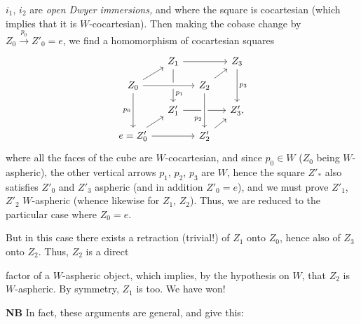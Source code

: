 \documentclass[11pt]{article}
\newcommand{\msp}[1]{\marginpar{\footnotesize [#1]}}
\begin{document}
$i_1$, $i_2$ are \textit{open Dwyer immersions,} and where the square is cocartesian (which implies that it is $W$-cocartesian). Then making the cobase change by $Z_0 \xrightarrow{p_0} Z'_0 = e$, we find a homomorphism of cocartesian squares
\[
\begin{tikzcd}[ampersand replacement=\&, column sep=small, row sep=small]
 \& Z_1 \arrow[rr] \arrow[dd, "p_1" near end] \& \& Z_3 \arrow[dd, "p_3"] \\
Z_0 \arrow[ur] \arrow[rr, crossing over] \arrow[dd, "p_0"'] \& \& Z_2 \arrow[ur] \& \\
 \& Z'_1 \arrow[rr] \& \& Z'_3, \\
e = Z'_0 \arrow[ur] \arrow[rr] \& \& Z'_2 \arrow[ur] \arrow[from=uu, crossing over, "p_2"' near end] \&
\end{tikzcd}
\]
where all the faces of the cube are $W$-cocartesian, and since $p_0 \in W$ ($Z_0$ being $W$-aspheric), the other vertical arrows $p_1$, $p_2$, $p_3$ are $W$, hence the square $Z'_*$ also satisfies $Z'_0$ and $Z'_3$ aspheric (and in addition $Z'_0 = e$), and we must prove $Z'_1$, $Z'_2$ $W$-aspheric (whence likewise for $Z_1$, $Z_2$). Thus, we are reduced to the particular case where $Z_0 = e$.

But in this case there exists a retraction (trivial!) of $Z_1$ onto $Z_0$, hence also of $Z_3$ onto $Z_2$. Thus, $Z_2$ is a direct

\msp{page 272}

factor of a $W$-aspheric object, which implies, by the hypothesis on $W$, that $Z_2$ is $W$-aspheric. By symmetry, $Z_1$ is too. We have won!

\textbf{NB} In fact, these arguments are general, and give this:
\end{document}
